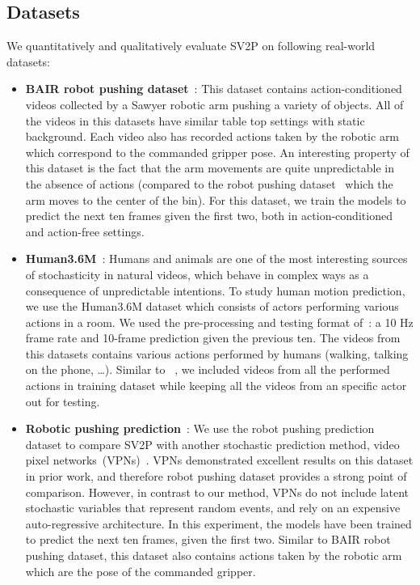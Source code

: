 \documentclass{article} \usepackage{iclr2018_conference,times}
\begin{document}
\subsection{Datasets}
We quantitatively and qualitatively evaluate SV2P on following real-world datasets:
\begin{itemize} [leftmargin=*]
\item \textbf{BAIR robot pushing dataset}~\citep{2017arXiv171005268E}: This dataset contains action-conditioned videos collected by a Sawyer robotic arm pushing a variety of objects. All of the videos in this datasets have similar table top settings with static background. Each video also has recorded actions taken by the robotic arm which correspond to the commanded gripper pose. An interesting property of this dataset is the fact that the arm movements are quite unpredictable in the absence of actions (compared to the robot pushing dataset~\citep{finn2016unsupervised} which the arm moves to the center of the bin). For this dataset, we train the models to predict the next ten frames given the first two, both in action-conditioned and action-free settings.  

\item \textbf{Human3.6M}~\citep{ionescu2014human3}: Humans and animals are one of the most interesting sources of stochasticity in natural videos, which behave in complex ways as a consequence of unpredictable intentions. To study human motion prediction, we use the Human3.6M dataset which consists of actors performing various actions in a room. We used the pre-processing and testing format of~\cite{finn2016unsupervised}: a 10 Hz frame rate and 10-frame prediction given the previous ten. The videos from this datasets contains various actions performed by humans (walking, talking on the phone, \ldots). Similar to ~\cite{finn2016unsupervised}, we included videos from all the performed actions in training dataset while keeping all the videos from an specific actor out for testing.

\item \textbf{Robotic pushing prediction}~\citep{finn2016unsupervised}: We use the robot pushing prediction dataset to compare SV2P with another stochastic prediction method, video pixel networks~(VPNs)~\citep{kalchbrenner2016video}. VPNs demonstrated excellent results on this dataset in prior work, and therefore robot pushing dataset provides a strong point of comparison. However, in contrast to our method, VPNs do not include latent stochastic variables that represent random events, and rely on an expensive auto-regressive architecture. In this experiment, the models have been trained to predict the next ten frames, given the first two. Similar to BAIR robot pushing dataset, this dataset also contains actions taken by the robotic arm which are the pose of the commanded gripper. 
\end{itemize}
\end{document}
